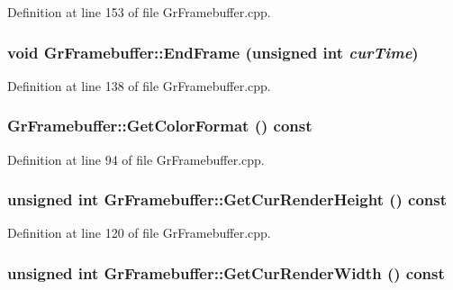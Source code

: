 Definition at line 153 of file GrFramebuffer.cpp.\hypertarget{class_gr_framebuffer_1e9e6b3669a0b5d3e07c92ba5290a8ec}{
\subsubsection[{EndFrame}]{\setlength{\rightskip}{0pt plus 5cm}void GrFramebuffer::EndFrame (unsigned int {\em curTime})}}
\label{class_gr_framebuffer_1e9e6b3669a0b5d3e07c92ba5290a8ec}




Definition at line 138 of file GrFramebuffer.cpp.\hypertarget{class_gr_framebuffer_28c6678e0d5bb83ea0ad0a6d1cf00a19}{
\subsubsection[{GetColorFormat}]{ GrFramebuffer::GetColorFormat () const}}
\label{class_gr_framebuffer_28c6678e0d5bb83ea0ad0a6d1cf00a19}




Definition at line 94 of file GrFramebuffer.cpp.\hypertarget{class_gr_framebuffer_75e0ed08bb86b57d1168785c5005512c}{
\subsubsection[{GetCurRenderHeight}]{\setlength{\rightskip}{0pt plus 5cm}unsigned int GrFramebuffer::GetCurRenderHeight () const}}
\label{class_gr_framebuffer_75e0ed08bb86b57d1168785c5005512c}




Definition at line 120 of file GrFramebuffer.cpp.\hypertarget{class_gr_framebuffer_31437c5337b08fcb8c7677ab4cce01f3}{
\subsubsection[{GetCurRenderWidth}]{\setlength{\rightskip}{0pt plus 5cm}unsigned int GrFramebuffer::GetCurRenderWidth () const}}
\label{class_gr_framebuffer_31437c5337b08fcb8c7677ab4cce01f3}




